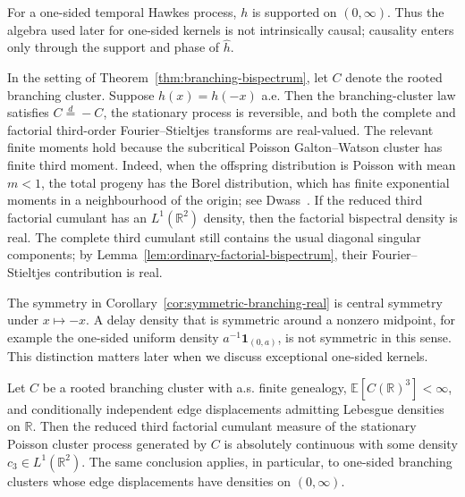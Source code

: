 \documentclass[aap,press]{apt} \volno{00} \partno{00}
\newcommand{\E}{\mathbb{E}}
\newcommand{\R}{\mathbb{R}}
\newcommand{\1}{\mathbf{1}}
\numberwithin{equation}{section}
\begin{document}
For a one-sided temporal Hawkes process, $h$ is supported on $(0,\infty)$. Thus the algebra used later for one-sided kernels is not intrinsically causal; causality enters only through the support and phase of $\widehat h$.


\begin{cor}\label{cor:symmetric-branching-real}
In the setting of Theorem~\ref{thm:branching-bispectrum}, let $C$ denote the rooted branching cluster. Suppose $h(x)=h(-x)$ a.e. Then the branching-cluster law satisfies $C\stackrel d=-C$, the stationary process is reversible, and both the complete and factorial third-order Fourier--Stieltjes transforms are real-valued. The relevant finite moments hold because the subcritical Poisson Galton--Watson cluster has finite third moment. Indeed, when the offspring distribution is Poisson with mean \(m<1\), the total progeny has the Borel distribution, which has finite exponential moments in a neighbourhood of the origin; see Dwass~\cite{dwass1969total}. If the reduced third factorial cumulant has an $L^1(\R^2)$ density, then the factorial bispectral density is real. The complete third cumulant still contains the usual diagonal singular components; by Lemma~\ref{lem:ordinary-factorial-bispectrum}, their Fourier--Stieltjes contribution is real.
\end{cor}

\begin{rem}
The symmetry in Corollary~\ref{cor:symmetric-branching-real} is central symmetry under $x\mapsto -x$. A delay density that is symmetric around a nonzero midpoint, for example the one-sided uniform density $a^{-1}\1_{(0,a)}$, is not symmetric in this sense. This distinction matters later when we discuss exceptional one-sided kernels.
\end{rem}

\begin{prop}\label{prop:L1-branching}
Let $C$ be a rooted branching cluster with a.s. finite genealogy, $\E[C(\R)^3]<\infty$, and conditionally independent edge displacements admitting Lebesgue densities on $\R$. Then the reduced third factorial cumulant measure of the stationary Poisson cluster process generated by $C$ is absolutely continuous with some density $c_3\in L^1(\R^2)$. The same conclusion applies, in particular, to one-sided branching clusters whose edge displacements have densities on $(0,\infty)$.
\end{prop}
\end{document}
